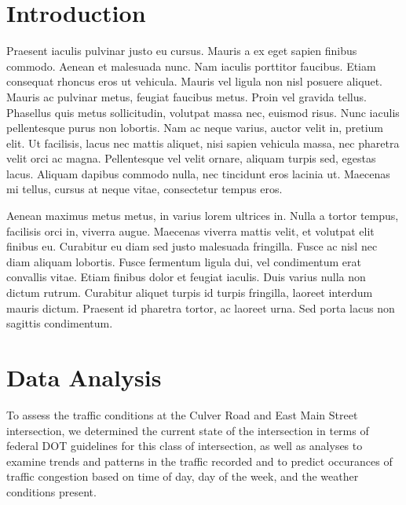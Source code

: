 \documentclass{report}
\begin{document}



\noindent
\section*{Introduction}


Praesent iaculis pulvinar justo eu cursus. Mauris a ex eget sapien finibus commodo. Aenean et malesuada nunc. Nam iaculis porttitor faucibus. Etiam consequat rhoncus eros ut vehicula. Mauris vel ligula non nisl posuere aliquet. Mauris ac pulvinar metus, feugiat faucibus metus. Proin vel gravida tellus. Phasellus quis metus sollicitudin, volutpat massa nec, euismod risus. Nunc iaculis pellentesque purus non lobortis. Nam ac neque varius, auctor velit in, pretium elit. Ut facilisis, lacus nec mattis aliquet, nisi sapien vehicula massa, nec pharetra velit orci ac magna. Pellentesque vel velit ornare, aliquam turpis sed, egestas lacus. Aliquam dapibus commodo nulla, nec tincidunt eros lacinia ut. Maecenas mi tellus, cursus at neque vitae, consectetur tempus eros.

Aenean maximus metus metus, in varius lorem ultrices in. Nulla a tortor tempus, facilisis orci in, viverra augue. Maecenas viverra mattis velit, et volutpat elit finibus eu. Curabitur eu diam sed justo malesuada fringilla. Fusce ac nisl nec diam aliquam lobortis. Fusce fermentum ligula dui, vel condimentum erat convallis vitae. Etiam finibus dolor et feugiat iaculis. Duis varius nulla non dictum rutrum. Curabitur aliquet turpis id turpis fringilla, laoreet interdum mauris dictum. Praesent id pharetra tortor, ac laoreet urna. Sed porta lacus non sagittis condimentum.

\noindent
\section*{Data Analysis}

To assess the traffic conditions at the Culver Road and East Main Street
intersection, we determined the current state of the intersection in terms of
federal DOT guidelines for this class of intersection, as well as analyses to
examine trends and patterns in the traffic recorded and to predict occurances of
traffic congestion based on time of day, day of the week, and the weather
conditions present.
\end{document}
